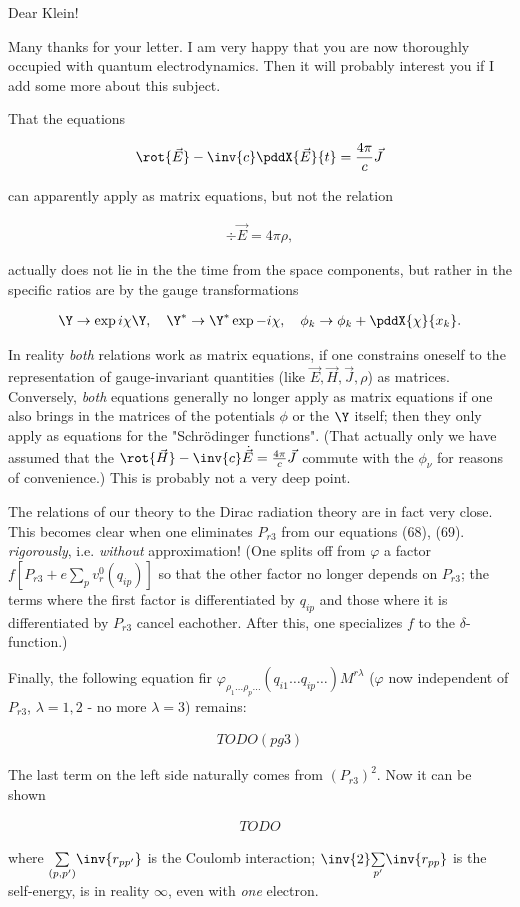 \documentclass{article}
\newcommand{\nc}[2]{
  \newcommand{#1}{#2}
}
\newcommand{\rc}[2]{
  \renewcommand{#1}{#2}
}
\newcommand{\nequ}[2]{
\begin{align*}
#1
\tag{#2}
\end{align*}
}
\newcommand{\uequ}[1]{
\begin{align*}
#1
\end{align*}
}
\newcommand{\sumX}[1]{\underset{#1}{\sum}}
\begin{document}
\date{February 10, 1930}

\rc{\E}{\vec{E}}
\rc{\H}{\vec{H}}
\nc{\J}{\vec{J}}

Dear Klein!

Many thanks for your letter. I am very happy that you are now thoroughly occupied with quantum electrodynamics. Then it will probably interest you if I add some more about this subject.

That the equations
\uequ{
\rot{\E} - \inv{c}\pddX{\E}{t} = \frac{4\pi}{c}\J
}
can apparently apply as matrix equations, but not the relation
\uequ{
\div{\E} = 4\pi\rho,
}
actually does not lie in the  the time from the space components, but rather in the specific ratios are  by the gauge transformations
\uequ{
\Y \to \exp{i\chi}\Y,\quad
\Y^* \to \Y^* \exp{-i\chi},\quad
\phi_k \to \phi_k + \pddX{\chi}{x_k}.
}
In reality \textit{both} relations work as matrix equations, if one constrains oneself to the representation of gauge-invariant quantities (like $\E,\H,\J,\rho$) as matrices. Conversely, \textit{both} equations generally no longer apply as matrix equations if one also brings in the matrices of the potentials $\phi$ or the $\Y$ itself; then they only apply as equations for the "Schr\"odinger functions". (That actually only we have assumed that the $\rot{\H} - \inv{c}\dot{\E} = \frac{4\pi}{c}\J$ commute with the $\phi_\nu$ for reasons of convenience.) This is probably not a very deep point.

The relations of our theory to the Dirac radiation theory are in fact very close. This becomes clear when one eliminates $P_{r3}$ from our equations (68), (69).  \textit{rigorously}, i.e. \textit{without} approximation! (One splits off from $\varphi$ a factor $f[P_{r3} + e\sumX{p}v_r^0 (q_{ip})]$ so that the other factor no longer depends on $P_{r3}$; the terms where the first factor is differentiated by $q_{ip}$ and those where it is differentiated by $P_{r3}$ cancel eachother. After this, one specializes $f$ to the $\delta$-function.)

Finally, the following equation fir $\varphi_{\rho_1 \dots \rho_p \dots}(q_{i1} \dots q_{ip} \dots)M^{r\lambda}$ ($\varphi$ now independent of $P_{r3}$, $\lambda=1,2$ - no more $\lambda=3$) remains:
\nequ{
TODO (pg 3)
}{1}
The last term on the left side naturally comes from $(P_{r3})^2$. Now it can be shown
\uequ{
TODO
}
where $\sumX{(p,p')}\inv{r_{pp'}}$ is the Coulomb interaction; $\inv{2}\sumX{p'}\inv{r_{pp}}$ is the self-energy, is in reality $\infty$, even with \textit{one} electron.
\end{document}
